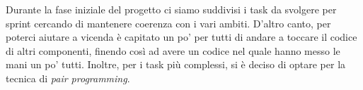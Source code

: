 Durante la fase iniziale del progetto ci siamo suddivisi i task da svolgere per sprint cercando di mantenere coerenza con i vari ambiti.
D'altro canto, per poterci aiutare a vicenda è capitato un po' per tutti di andare a toccare il codice di altri componenti, finendo così ad avere un codice nel quale hanno messo le mani un po' tutti.
Inoltre, per i task più complessi, si è deciso di optare per la tecnica di \textit{pair programming}.